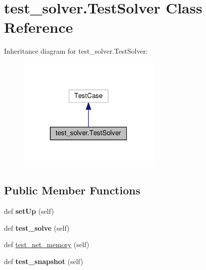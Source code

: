 \hypertarget{classtest__solver_1_1_test_solver}{}\section{test\+\_\+solver.\+Test\+Solver Class Reference}
\label{classtest__solver_1_1_test_solver}


Inheritance diagram for test\+\_\+solver.\+Test\+Solver\+:
\nopagebreak
\begin{figure}[H]
\begin{center}
\leavevmode
\includegraphics[width=195pt]{classtest__solver_1_1_test_solver__inherit__graph}
\end{center}
\end{figure}
\subsection*{Public Member Functions}
\begin{DoxyCompactItemize}
\item 
\mbox{\label{classtest__solver_1_1_test_solver_ae66a20cbe4bee7698988c942f952d4a4}} 
def {\bfseries set\+Up} (self)
\item 
\mbox{\label{classtest__solver_1_1_test_solver_afee26d7e2697201c53619d45155cd201}} 
def {\bfseries test\+\_\+solve} (self)
\item 
def \mbox{\hyperlink{classtest__solver_1_1_test_solver_a96cd6dd0b2efecf67ee792f6f996a025}{test\+\_\+net\+\_\+memory}} (self)
\item 
\mbox{\label{classtest__solver_1_1_test_solver_a0dae3d8b3a7c9601fcdd244d3302a929}} 
def {\bfseries test\+\_\+snapshot} (self)
\end{DoxyCompactItemize}
